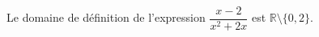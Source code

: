 Le domaine de définition de l'expression $\dfrac{x-2}{x^2+2x}$ est $\mathbb R \setminus \{0,2\}$.

\begin{reponses}
\end{reponses}

